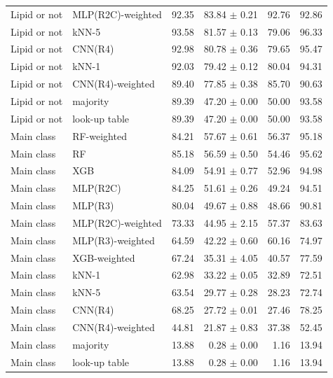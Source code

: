 \begin{tabular}{llrrrr}
Lipid or not & MLP(R2C)-weighted & 92.35 & 83.84 $\pm$ 0.21 & 92.76 & 92.86 \\
Lipid or not & kNN-5 & 93.58 & 81.57 $\pm$ 0.13 & 79.06 & 96.33 \\
Lipid or not & CNN(R4) & 92.98 & 80.78 $\pm$ 0.36 & 79.65 & 95.47 \\
Lipid or not & kNN-1 & 92.03 & 79.42 $\pm$ 0.12 & 80.04 & 94.31 \\
Lipid or not & CNN(R4)-weighted & 89.40 & 77.85 $\pm$ 0.38 & 85.70 & 90.63 \\
Lipid or not & majority & 89.39 & 47.20 $\pm$ 0.00 & 50.00 & 93.58 \\
Lipid or not & look-up table & 89.39 & 47.20 $\pm$ 0.00 & 50.00 & 93.58 \\
Main class & RF-weighted & 84.21 & 57.67 $\pm$ 0.61 & 56.37 & 95.18 \\
Main class & RF & 85.18 & 56.59 $\pm$ 0.50 & 54.46 & 95.62 \\
Main class & XGB & 84.09 & 54.91 $\pm$ 0.77 & 52.96 & 94.98 \\
Main class & MLP(R2C) & 84.25 & 51.61 $\pm$ 0.26 & 49.24 & 94.51 \\
Main class & MLP(R3) & 80.04 & 49.67 $\pm$ 0.88 & 48.66 & 90.81 \\
Main class & MLP(R2C)-weighted & 73.33 & 44.95 $\pm$ 2.15 & 57.37 & 83.63 \\
Main class & MLP(R3)-weighted & 64.59 & 42.22 $\pm$ 0.60 & 60.16 & 74.97 \\
Main class & XGB-weighted & 67.24 & 35.31 $\pm$ 4.05 & 40.57 & 77.59 \\
Main class & kNN-1 & 62.98 & 33.22 $\pm$ 0.05 & 32.89 & 72.51 \\
Main class & kNN-5 & 63.54 & 29.77 $\pm$ 0.28 & 28.23 & 72.74 \\
Main class & CNN(R4) & 68.25 & 27.72 $\pm$ 0.01 & 27.46 & 78.25 \\
Main class & CNN(R4)-weighted & 44.81 & 21.87 $\pm$ 0.83 & 37.38 & 52.45 \\
Main class & majority & 13.88 & 0.28 $\pm$ 0.00 & 1.16 & 13.94 \\
Main class & look-up table & 13.88 & 0.28 $\pm$ 0.00 & 1.16 & 13.94 \\
\bottomrule
\end{tabular}
